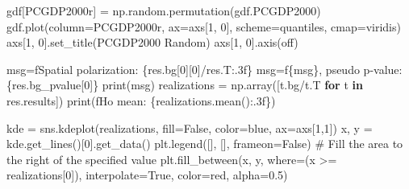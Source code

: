 \documentclass[
  a4paper, 
  twoside,
  final
]{article}
\newenvironment{Shaded}{\begin{snugshade}}{\end{snugshade}}
\newcommand{\BuiltInTok}[1]{\textcolor[rgb]{0.00,0.23,0.31}{#1}}
\newcommand{\CommentTok}[1]{\textcolor[rgb]{0.37,0.37,0.37}{#1}}
\newcommand{\ControlFlowTok}[1]{\textcolor[rgb]{0.00,0.23,0.31}{\textbf{#1}}}
\newcommand{\DecValTok}[1]{\textcolor[rgb]{0.68,0.00,0.00}{#1}}
\newcommand{\FloatTok}[1]{\textcolor[rgb]{0.68,0.00,0.00}{#1}}
\newcommand{\KeywordTok}[1]{\textcolor[rgb]{0.00,0.23,0.31}{\textbf{#1}}}
\newcommand{\NormalTok}[1]{\textcolor[rgb]{0.00,0.23,0.31}{#1}}
\newcommand{\OperatorTok}[1]{\textcolor[rgb]{0.37,0.37,0.37}{#1}}
\newcommand{\SpecialCharTok}[1]{\textcolor[rgb]{0.37,0.37,0.37}{#1}}
\newcommand{\SpecialStringTok}[1]{\textcolor[rgb]{0.13,0.47,0.30}{#1}}
\newcommand{\StringTok}[1]{\textcolor[rgb]{0.13,0.47,0.30}{#1}}
\newcommand{\VariableTok}[1]{\textcolor[rgb]{0.07,0.07,0.07}{#1}}
\begin{document}
\begin{Shaded}
\begin{Highlighting}[]
\NormalTok{gdf[}\StringTok{\textquotesingle{}PCGDP2000r\textquotesingle{}}\NormalTok{] }\OperatorTok{=}\NormalTok{ np.random.permutation(gdf.PCGDP2000)}
\NormalTok{gdf.plot(column}\OperatorTok{=}\StringTok{\textquotesingle{}PCGDP2000r\textquotesingle{}}\NormalTok{, ax}\OperatorTok{=}\NormalTok{axs[}\DecValTok{1}\NormalTok{, }\DecValTok{0}\NormalTok{], scheme}\OperatorTok{=}\StringTok{\textquotesingle{}quantiles\textquotesingle{}}\NormalTok{,}
\NormalTok{         cmap}\OperatorTok{=}\StringTok{\textquotesingle{}viridis\textquotesingle{}}\NormalTok{)}
\NormalTok{axs[}\DecValTok{1}\NormalTok{, }\DecValTok{0}\NormalTok{].set\_title(}\StringTok{\textquotesingle{}PCGDP2000 Random\textquotesingle{}}\NormalTok{)}
\NormalTok{axs[}\DecValTok{1}\NormalTok{, }\DecValTok{0}\NormalTok{].axis(}\StringTok{\textquotesingle{}off\textquotesingle{}}\NormalTok{)}

\NormalTok{msg}\OperatorTok{=}\SpecialStringTok{f\textquotesingle{}Spatial polarization: }\SpecialCharTok{\{}\NormalTok{res}\SpecialCharTok{.}\NormalTok{bg[}\DecValTok{0}\NormalTok{][}\DecValTok{0}\NormalTok{]}\OperatorTok{/}\NormalTok{res}\SpecialCharTok{.}\NormalTok{T}\SpecialCharTok{:.3f\}}\SpecialStringTok{\textquotesingle{}}
\NormalTok{msg}\OperatorTok{=}\SpecialStringTok{f\textquotesingle{}}\SpecialCharTok{\{}\NormalTok{msg}\SpecialCharTok{\}}\SpecialStringTok{, pseudo p{-}value: }\SpecialCharTok{\{}\NormalTok{res}\SpecialCharTok{.}\NormalTok{bg\_pvalue[}\DecValTok{0}\NormalTok{]}\SpecialCharTok{\}}\SpecialStringTok{\textquotesingle{}}
\BuiltInTok{print}\NormalTok{(msg)}
\NormalTok{realizations }\OperatorTok{=}\NormalTok{ np.array([t.bg}\OperatorTok{/}\NormalTok{t.T }\ControlFlowTok{for}\NormalTok{ t }\KeywordTok{in}\NormalTok{ res.results])}
\BuiltInTok{print}\NormalTok{(}\SpecialStringTok{f\textquotesingle{}Ho mean: }\SpecialCharTok{\{}\NormalTok{realizations}\SpecialCharTok{.}\NormalTok{mean()}\SpecialCharTok{:.3f\}}\SpecialStringTok{\textquotesingle{}}\NormalTok{)}

\NormalTok{kde }\OperatorTok{=}\NormalTok{ sns.kdeplot(realizations, fill}\OperatorTok{=}\VariableTok{False}\NormalTok{, color}\OperatorTok{=}\StringTok{\textquotesingle{}blue\textquotesingle{}}\NormalTok{, ax}\OperatorTok{=}\NormalTok{axs[}\DecValTok{1}\NormalTok{,}\DecValTok{1}\NormalTok{])}
\NormalTok{x, y }\OperatorTok{=}\NormalTok{ kde.get\_lines()[}\DecValTok{0}\NormalTok{].get\_data()}
\NormalTok{plt.legend([], [], frameon}\OperatorTok{=}\VariableTok{False}\NormalTok{)}
\CommentTok{\# Fill the area to the right of the specified value}
\NormalTok{plt.fill\_between(x, y, where}\OperatorTok{=}\NormalTok{(x }\OperatorTok{\textgreater{}=}\NormalTok{ realizations[}\DecValTok{0}\NormalTok{]),}
\NormalTok{                 interpolate}\OperatorTok{=}\VariableTok{True}\NormalTok{, color}\OperatorTok{=}\StringTok{\textquotesingle{}red\textquotesingle{}}\NormalTok{, alpha}\OperatorTok{=}\FloatTok{0.5}\NormalTok{)}


\end{Highlighting}
\end{Shaded}
\end{document}
